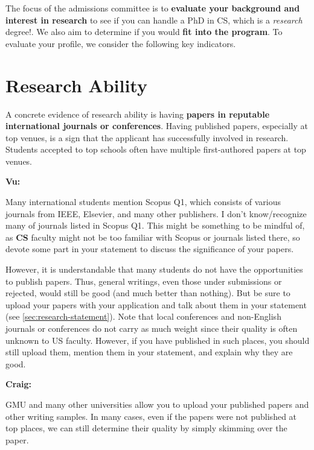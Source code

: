 \documentclass[oneside,11pt,dvipsnames]{book}
\newenvironment{commentbox}[1][]{
  \small
  \begin{mybox}
    {\small \textbf{#1}}
  }{
  \end{mybox}
}
\begin{document}
The focus of the admissions committee is to \textbf{evaluate your background and interest in research} to see if you can handle a PhD in CS, which is a \emph{research} degree!. We also aim to determine if you would \textbf{fit into the program}. To evaluate your profile, we consider
the following key indicators.

\section{Research Ability}\label{sec:research-ability}

A concrete evidence of research ability is having \textbf{papers in reputable international journals or conferences}.
Having published papers, especially at top venues, is a sign that the applicant has successfully involved in research.  Students  accepted to top schools often have multiple first-authored papers at top venues.

\begin{commentbox}[Vu:]
  Many international students mention Scopus Q1, which consists of various journals from IEEE, Elsevier, and many other publishers.  I don't know/recognize many of journals listed in Scopus Q1. This might be something to be mindful of, as \textbf{CS} faculty might not be too familiar with Scopus or journals listed there, so devote some part in your statement to discuss the significance of your papers.
\end{commentbox}

However, it is understandable that many students do not have the opportunities to publish papers. Thus, general writings, even those under submissions or rejected, would still be good (and much better than nothing).  But be sure to upload your papers with your application and talk about them in your statement (see \autoref{sec:research-statement}).  Note that local conferences and non-English journals or conferences do
not carry as much weight since their quality is often unknown to US faculty. However, if you have published in such places, you should still upload them, mention them in your statement, and explain why they are good.




\begin{commentbox}[Craig:]
  GMU and many other universities allow you to upload your published papers and other writing samples. In many cases, even if the papers were not published at top places, we can still determine their quality by simply skimming over the paper.
\end{commentbox}
\end{document}
